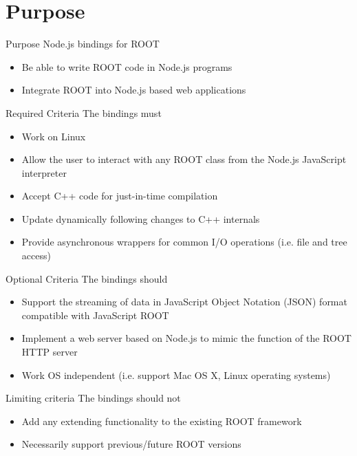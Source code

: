 \section{Purpose}
\begin{frame}{Purpose}
	Node.js bindings for ROOT
	 \begin{itemize}
		\item Be able to write ROOT code in Node.js programs
		\item Integrate ROOT into Node.js based web applications
	 \end{itemize}
\end{frame}

\begin{frame}{Required Criteria}
	The bindings must
	 \begin{itemize}
		\item Work on Linux
		\item Allow the user to interact with any ROOT class from the Node.js JavaScript interpreter
		\item Accept C++ code for just-in-time compilation
		\item Update dynamically following changes to C++ internals
		\item Provide asynchronous wrappers for common I/O operations (i.e. file and tree access)
	 \end{itemize}
\end{frame}

\begin{frame}{Optional Criteria}
	The bindings should
	\begin{itemize}
		\item Support the streaming of data in JavaScript Object Notation (JSON) format compatible with JavaScript ROOT
		\item Implement a web server based on Node.js to mimic the function of the ROOT HTTP server
		\item Work OS independent (i.e. support Mac OS X, Linux operating systems)
	\end{itemize}
\end{frame}

\begin{frame}{Limiting criteria} 
	The bindings should not
	\begin{itemize}
		\item Add any extending functionality to the existing ROOT framework
		\item Necessarily support previous/future ROOT versions
	\end{itemize}
\end{frame}
